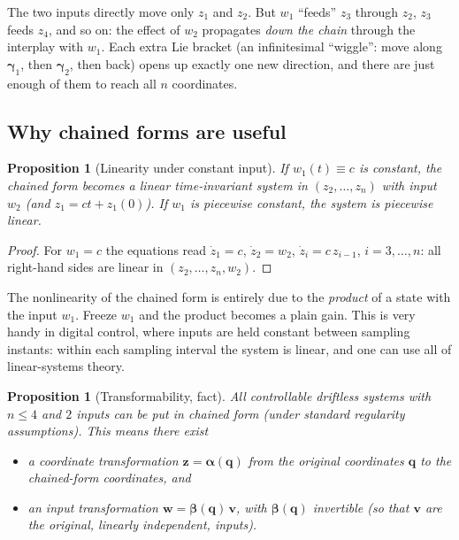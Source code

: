 \documentclass[11pt,a4paper]{article}
\theoremstyle{definition}
\theoremstyle{plain}
\newtheorem{proposition}[definition]{Proposition}
\newcommand{\qv}{\bm{q}}
\newcommand{\zv}{\bm{z}}
\newcommand{\wv}{\bm{w}}
\newcommand{\vv}{\bm{v}}
\begin{document}
\begin{intuition}
The two inputs directly move only $z_1$ and $z_2$. But $w_1$ ``feeds'' $z_3$ through $z_2$, $z_3$ feeds $z_4$, and so on: the effect of $w_2$ propagates \emph{down the chain} through the interplay with $w_1$. Each extra Lie bracket (an infinitesimal ``wiggle'': move along $\bm\gamma_1$, then $\bm\gamma_2$, then back) opens up exactly one new direction, and there are just enough of them to reach all $n$ coordinates.
\end{intuition}

\subsection{Why chained forms are useful}

\begin{proposition}[Linearity under constant input]\label{prop:linear}
If $w_1(t)\equiv c$ is constant, the chained form becomes a \emph{linear} time-invariant system in $(z_2,\dots,z_n)$ with input $w_2$ (and $z_1=ct+z_1(0)$). If $w_1$ is piecewise constant, the system is piecewise linear.
\end{proposition}
\begin{proof}
For $w_1=c$ the equations read $\dot z_1=c$, $\dot z_2=w_2$, $\dot z_i=c\,z_{i-1}$, $i=3,\dots,n$: all right-hand sides are linear in $(z_2,\dots,z_n,w_2)$.
\end{proof}

\begin{intuition}
The nonlinearity of the chained form is entirely due to the \emph{product} of a state with the input $w_1$. Freeze $w_1$ and the product becomes a plain gain. This is very handy in digital control, where inputs are held constant between sampling instants: within each sampling interval the system is linear, and one can use all of linear-systems theory.
\end{intuition}

\begin{proposition}[Transformability, fact]\label{prop:transform}
All controllable driftless systems with $n\le 4$ and $2$ inputs can be put in chained form (under standard regularity assumptions). This means there exist
\begin{itemize}[nosep]
  \item a \emph{coordinate transformation} $\zv=\bm\alpha(\qv)$ from the original coordinates $\qv$ to the chained-form coordinates, and
  \item an \emph{input transformation} $\wv=\bm\beta(\qv)\,\vv$, with $\bm\beta(\qv)$ invertible (so that $\vv$ are the original, linearly independent, inputs).
\end{itemize}
\end{proposition}
\end{document}
